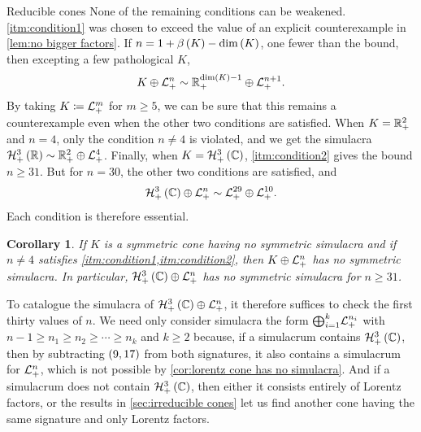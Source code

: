 \documentclass{interact}
\theoremstyle{plain}
\newtheorem{corollary}[theorem]{Corollary}
\theoremstyle{definition}
\theoremstyle{remark}
\begin{document}
\begin{section}{Reducible cones}
    None of the remaining conditions can be
    weakened\@. \cref{itm:condition1} was chosen to exceed the value
    of an explicit counterexample in \cref{lem:no bigger factors}. If
    $n = 1 + \lyapunovrank{K} - \dim\of{K}$, one fewer than the bound,
    then excepting a few pathological $K$,
    \begin{equation*}
      \directsum{K}{\Lnplus}
      \sim
      \directsum{\Rnplus[\dim\of{K}-1]}{\Lnplus[n+1]}.
    \end{equation*}
    By taking $K \coloneqq \Lnplus[m]$ for $m \ge 5$, we can be sure
    that this remains a counterexample even when the other two
    conditions are satisfied. When $K = \Rnplus[2]$ and $n = 4$, only
    the condition $n \ne 4$ is violated, and we get the simulacra
    $\Hnplus[3]\of{\Rn[1]} \sim \directsum{\Rnplus[2]}{\Lnplus[4]}$.
    Finally, when $K = \Hnplus[3]\of{\Cn[1]}$, \cref{itm:condition2}
    gives the bound $n \ge 31$. But for $n = 30$, the other two
    conditions are satisfied, and
    \begin{equation*}
      \directsum{\Hnplus[3]\of{\Cn[1]}}{\Lnplus}
      \sim
      \directsum{\Lnplus[29]}{\Lnplus[10]}.
    \end{equation*}
    Each condition is therefore essential.

    \begin{corollary}
      If $K$ is a symmetric cone having no symmetric simulacra and if
      $n \ne 4$ satisfies \cref{itm:condition1,itm:condition2}, then
      $\directsum{K}{\Lnplus}$ has no symmetric simulacra. In
      particular, $\directsum{\Hnplus[3]\of{\Cn[1]}}{\Lnplus}$ has no
      symmetric simulacra for $n \ge 31$.
    \end{corollary}

    To catalogue the simulacra of
    $\directsum{\Hnplus[3]\of{\Cn[1]}}{\Lnplus}$, it therefore
    suffices to check the first thirty values of $n$. We need only
    consider simulacra the form
    $\directsummany{i=1}{k}{\Lnplus[n_{i}]}$ with $n-1 \ge n_{1} \ge
    n_{2} \ge \cdots \ge n_{k}$ and $k \ge 2$ because, if a simulacrum
    contains $\Hnplus[3]\of{\Cn[1]}$, then by subtracting
    $\pair{9}{17}$ from both signatures, it also contains a simulacrum
    for $\Lnplus$, which is not possible by \cref{cor:lorentz cone has
      no simulacra}. And if a simulacrum does not contain
    $\Hnplus[3]\of{\Cn[1]}$, then either it consists entirely of
    Lorentz factors, or the results in \cref{sec:irreducible cones}
    let us find another cone having the same signature and only
    Lorentz factors.


\end{section}
\end{document}
